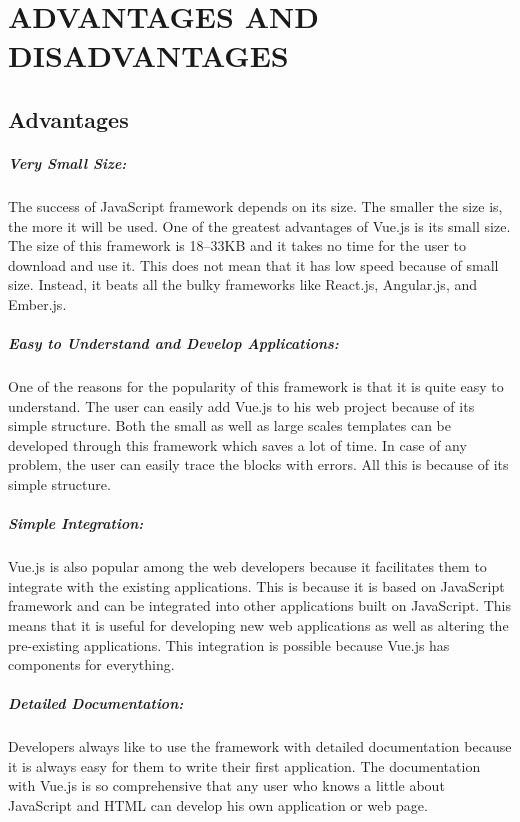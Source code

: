 \documentclass[12pt,a4paper,oneside]{report}
\begin{document}
\chapter{ADVANTAGES AND DISADVANTAGES}
\section{Advantages}
\paragraph{Very Small Size:}
The success of JavaScript framework depends on its size. The
smaller the size is, the more it will be used. One of the greatest
advantages of Vue.js is its small size. The size of this framework
is 18–33KB and it takes no time for the user to download and use
it. This does not mean that it has low speed because of small size.
Instead, it beats all the bulky frameworks like React.js, Angular.js,
and Ember.js.
\paragraph{Easy to Understand and Develop Applications:}
One of the reasons for the popularity of this framework is that it is
quite easy to understand. The user can easily add Vue.js to his web
project because of its simple structure. Both the small as well as
large scales templates can be developed through this framework
which saves a lot of time. In case of any problem, the user can
easily trace the blocks with errors. All this is because of its simple
structure.
\paragraph{Simple Integration:} Vue.js is also popular among the web developers because it
facilitates them to integrate with the existing applications. This is
because it is based on JavaScript framework and can be integrated
into other applications built on JavaScript. This means that it is
useful for developing new web applications as well as altering the
pre-existing applications. This integration is possible because
Vue.js has components for everything.
\paragraph{Detailed Documentation:}
Developers always like to use the framework with detailed
documentation because it is always easy for them to write their
first application. The documentation with Vue.js is so
comprehensive that any user who knows a little about JavaScript
and HTML can develop his own application or web page.
\end{document}
